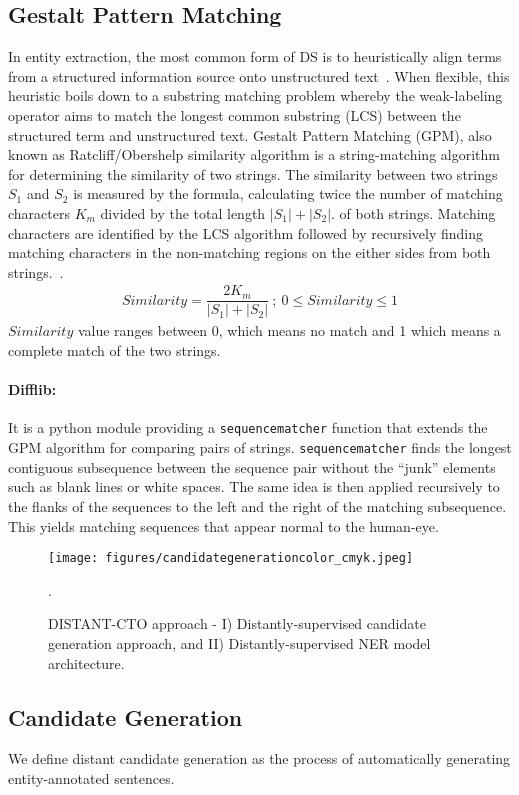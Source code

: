 \documentclass[letterpaper]{article} %
\begin{document}
\subsection{Gestalt Pattern Matching}
\label{subsec_gsp}
%
In entity extraction, the most common form of DS is to heuristically align terms from a structured information source onto unstructured text~\cite{wen2019efficient}.
When flexible, this heuristic boils down to a substring matching problem whereby the weak-labeling operator aims to match the longest common substring (LCS) between the structured term and unstructured text.
Gestalt Pattern Matching (GPM), also known as Ratcliff/Obershelp similarity algorithm is a string-matching algorithm for determining the similarity of two strings.
The similarity between two strings $S_{1}$ and $S_{2}$ is measured by the formula, calculating twice the number of matching characters $K_{m}$ divided by the total length $|S_{1}| + |S_{2}|$.
of both strings.
Matching characters are identified by the LCS algorithm followed by recursively finding matching characters in the non-matching regions on the either sides from both strings.~\cite{ratcliff1988pattern}.
%
\begin{gather}
  Similarity = \dfrac{ 2 K_{m}}{|S_{1}| + |S_{2}|} \: ; \: 0 \leq	 Similarity \leq	 1
\end{gather}
%
$Similarity$ value ranges between 0, which means no match and 1 which means a complete match of the two strings.
%
\paragraph{Difflib: }
It is a python module providing a {\tt sequencematcher} function that extends the GPM algorithm for comparing pairs of strings.
{\tt sequencematcher} finds the longest contiguous subsequence between the sequence pair without the ``junk'' elements such as blank lines or white spaces.
The same idea is then applied recursively to the flanks of the sequences to the left and the right of the matching subsequence.
This yields matching sequences that appear normal to the human-eye.
%
\begin{figure*}[ht]
\centering
\texttt{[image: figures/candidategenerationcolor\_cmyk.jpeg]} 
\caption{DISTANT-CTO approach - I) Distantly-supervised candidate generation approach, and II) Distantly-supervised NER model architecture.}.
\label{method:approach}
\end{figure*}
%
\subsection{Candidate Generation}
\label{subsec:candgen}
%
We define distant candidate generation as the process of automatically generating entity-annotated sentences.
%
\end{document}

